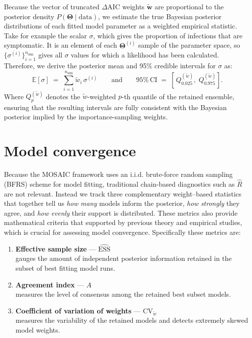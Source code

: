 \documentclass[
]{book}
\providecommand{\tightlist}{%
  \setlength{\itemsep}{0pt}\setlength{\parskip}{0pt}}
\begin{document}
Because the vector of truncated \(\Delta \text{AIC}\) weights \(\mathbf{\tilde{w}}\) are proportional to the posterior density \(P(\boldsymbol{\Theta}\mid\text{data})\), we estimate the true Bayesian posterior distributions of each fitted model parameter as a weighted empirical statistic. Take for example the scalar \(\sigma\), which gives the proportion of infections that are symptomatic. It is an element of each \(\boldsymbol{\Theta}^{(i)}\) sample of the parameter space, so \(\bigl\{\sigma^{(i)}\bigr\}_{i=1}^{n_{\text{sim}}}\) gives all \(\sigma\) values for which a likelihood has been calculated. Therefore, we derive the posterior mean and 95\% credible intervals for \(\sigma\) as:
\begin{equation}
\mathbb{E}[\sigma] \;=\; \sum_{i=1}^{n_{\text{sim}}} \tilde{w}_i\,\sigma^{(i)}
\qquad \text{and} \qquad
95\% \, \text{CI} \;=\; \left[\,Q^{(\tilde{w})}_{0.025},\; Q^{(\tilde{w})}_{0.975}\right].
\label{eq:weighted-posterior}
\end{equation}
Where \(Q^{(\tilde{w})}_{p}\) denotes the \(\tilde{w}\)-weighted \(p\)-th quantile of the retained ensemble, ensuring that the resulting intervals are
fully consistent with the Bayesian posterior implied by the importance-sampling weights.

\section{Model convergence}\label{model-convergence}

Because the MOSAIC framework uses an i.i.d. brute-force random sampling (BFRS) scheme for model fitting, traditional chain-based diagnostics such as \(\hat R\) are not relevant. Instead we track three complementary weight--based statistics that together tell us \emph{how many} models inform the posterior, \emph{how strongly} they agree, and \emph{how evenly} their support is distributed. These metrics also provide mathematical criteria that supported by previous theory and empirical studies, which is crucial for assessing model convergence. Specifically these metrics are:

\begin{enumerate}
\def\labelenumi{\arabic{enumi}.}
\tightlist
\item
  \textbf{Effective sample size} --- \(\widehat{\text{ESS}}\)\\
  gauges the amount of independent posterior information retained in the subset of best fitting model runs.
\item
  \textbf{Agreement index} --- \(A\)\\
  measures the level of consensus among the retained best subset models.
\item
  \textbf{Coefficient of variation of weights} --- \(\mathrm{CV}_{\tilde w}\)\\
  measures the variability of the retained models and detects extremely skewed model weights.
\end{enumerate}
\end{document}
